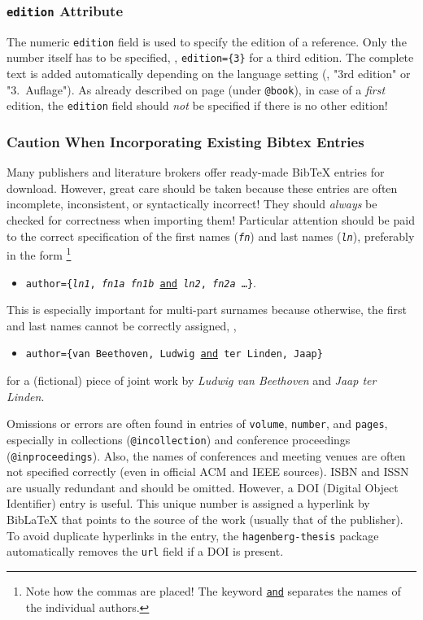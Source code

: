 \subsubsection{\texttt{edition} Attribute}

The numeric \texttt{edition} field is used to specify the edition of a
reference. Only the number itself has to be specified, \eg, \verb!edition={3}!
for a third edition. The complete text is added automatically depending on the
language setting (\eg, "3rd edition" or "3.\ Auflage"). As already described on
page \pageref{sec:@book} (under \texttt{@book}), in case of a
\emph{first} edition, the \texttt{edition} field should
\emph{not} be specified if there is no other edition!

\subsubsection{Caution When Incorporating Existing Bibtex Entries}

Many publishers and literature brokers offer ready-made BibTeX entries for
download. However, great care should be taken because these entries are often
incomplete, inconsistent, or syntactically incorrect! They should \emph{always}
be checked for correctness when importing them! Particular attention should be
paid to the correct specification of the first names (\texttt{\textit{fn}}) and
last names (\texttt{\textit{ln}}), preferably in the form%
\footnote{Note how the commas are placed! The keyword \underline{\texttt{and}}
separates the names of the individual authors.}
%
\begin{itemize}
\item[]
\texttt{author=\{\textit{ln1}, \textit{fn1a} \emph{fn1b} \underline{and}
\textit{ln2}, \textit{fn2a} \ldots \}}.
\end{itemize}
%
This is especially important for multi-part surnames because otherwise, the
first and last names cannot be correctly assigned, \eg,
%
\begin{itemize}
\item[]
\texttt{author=\{van Beethoven, Ludwig \underline{and} ter Linden, Jaap\}}
\end{itemize}
%
for a (fictional) piece of joint work by \emph{Ludwig van Beethoven} and \emph{Jaap ter
Linden}.

Omissions or errors are often found in entries of \texttt{volume},
\texttt{number}, and \texttt{pages}, especially in collections
(\texttt{@incollection}) and conference proceedings (\texttt{@inproceedings}).
Also, the names of conferences and meeting venues are often not specified
correctly (even in official ACM and IEEE sources). ISBN and ISSN are usually
redundant and should be omitted. However, a DOI (Digital Object Identifier)
entry is useful. This unique number is assigned a hyperlink by BibLaTeX that
points to the source of the work (usually that of the publisher). To avoid
duplicate hyperlinks in the entry, the \texttt{hagenberg-thesis} package
automatically removes the \texttt{url} field if a DOI is present.

